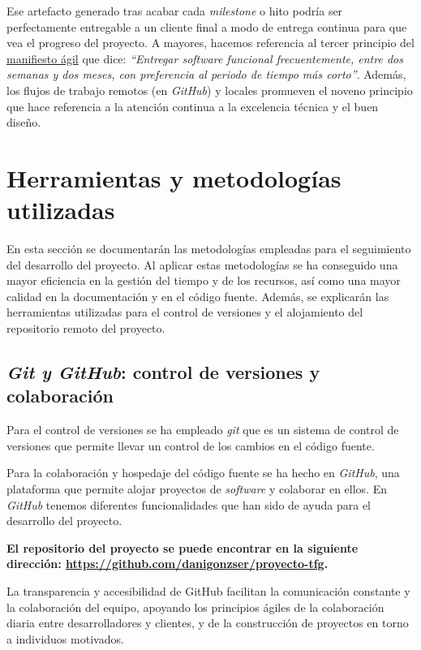 Ese artefacto generado tras acabar cada \textit{milestone} o hito podría ser perfectamente entregable a un cliente final a modo de entrega continua para que vea el progreso del proyecto. A mayores, hacemos referencia al tercer principio del \href{https://agilemanifesto.org/iso/es/principles.html}{manifiesto ágil} que dice: \textit{``Entregar software funcional frecuentemente, entre dos semanas y dos meses, con preferencia al periodo de tiempo más corto''}. Además, los flujos de trabajo remotos (en \textit{GitHub}) y locales promueven el noveno principio que hace referencia a la atención continua a la excelencia técnica y el buen diseño.

\section{Herramientas y metodologías utilizadas}

En esta sección se documentarán las metodologías empleadas para el seguimiento del desarrollo del proyecto. Al aplicar estas metodologías se ha conseguido una mayor eficiencia en la gestión del tiempo y de los recursos, así como una mayor calidad en la documentación y en el código fuente. Además, se explicarán las herramientas utilizadas para el control de versiones y el alojamiento del repositorio remoto del proyecto.

\subsection{\textit{Git y GitHub}: control de versiones y colaboración}

Para el control de versiones se ha empleado \textit{git} que es un sistema de control de versiones que permite llevar un control de los cambios en el código fuente.

Para la colaboración y hospedaje del código fuente se ha hecho en \textit{GitHub}, una plataforma que permite alojar proyectos de \textit{software} y colaborar en ellos. En \textit{GitHub} tenemos diferentes funcionalidades que han sido de ayuda para el desarrollo del proyecto.

\textbf{El repositorio del proyecto se puede encontrar en la siguiente dirección: \url{https://github.com/danigonzser/proyecto-tfg}.}

La transparencia y accesibilidad de GitHub facilitan la comunicación constante y la colaboración del equipo, apoyando los principios ágiles de la colaboración diaria entre desarrolladores y clientes, y de la construcción de proyectos en torno a individuos motivados.

